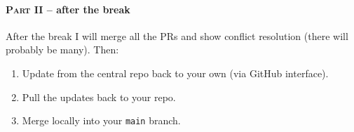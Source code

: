 \documentclass[a4paper]{article}
\begin{document}
\paragraph{\textsc{Part II} -- after the break}

After the break I will merge all the PRs and show conflict resolution
(there will probably be many). Then:

\begin{enumerate}
\item Update from the central repo back to your own (via GitHub interface).
\item Pull the updates back to your repo.
\item Merge locally into your \texttt{main} branch.
\end{enumerate}
\end{document}
